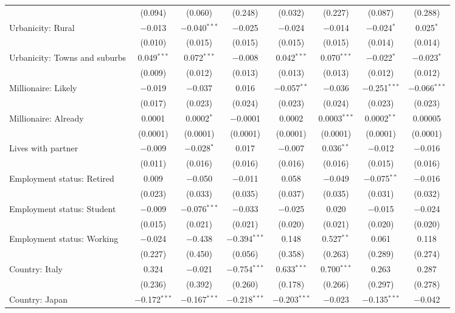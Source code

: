 \begin{tabular}{@{\extracolsep{5pt}}lccccccc}
  & (0.094) & (0.060) & (0.248) & (0.032) & (0.227) & (0.087) & (0.288) \\ 
  Urbanicity: Rural & $-$0.013 & $-$0.040$^{***}$ & $-$0.025 & $-$0.024 & $-$0.014 & $-$0.024$^{*}$ & 0.025$^{*}$ \\ 
  & (0.010) & (0.015) & (0.015) & (0.015) & (0.015) & (0.014) & (0.014) \\ 
  Urbanicity: Towns and suburbs & 0.049$^{***}$ & 0.072$^{***}$ & $-$0.008 & 0.042$^{***}$ & 0.070$^{***}$ & $-$0.022$^{*}$ & $-$0.023$^{*}$ \\ 
  & (0.009) & (0.012) & (0.013) & (0.013) & (0.013) & (0.012) & (0.012) \\ 
  Millionaire: Likely & $-$0.019 & $-$0.037 & 0.016 & $-$0.057$^{**}$ & $-$0.036 & $-$0.251$^{***}$ & $-$0.066$^{***}$ \\ 
  & (0.017) & (0.023) & (0.024) & (0.023) & (0.024) & (0.023) & (0.023) \\ 
  Millionaire: Already & 0.0001 & 0.0002$^{*}$ & $-$0.0001 & 0.0002 & 0.0003$^{***}$ & 0.0002$^{**}$ & 0.00005 \\ 
  & (0.0001) & (0.0001) & (0.0001) & (0.0001) & (0.0001) & (0.0001) & (0.0001) \\ 
  Lives with partner & $-$0.009 & $-$0.028$^{*}$ & 0.017 & $-$0.007 & 0.036$^{**}$ & $-$0.012 & $-$0.016 \\ 
  & (0.011) & (0.016) & (0.016) & (0.016) & (0.016) & (0.015) & (0.016) \\ 
  Employment status: Retired & 0.009 & $-$0.050 & $-$0.011 & 0.058 & $-$0.049 & $-$0.075$^{**}$ & $-$0.016 \\ 
  & (0.023) & (0.033) & (0.035) & (0.037) & (0.035) & (0.031) & (0.032) \\ 
  Employment status: Student & $-$0.009 & $-$0.076$^{***}$ & $-$0.033 & $-$0.025 & 0.020 & $-$0.015 & $-$0.024 \\ 
  & (0.015) & (0.021) & (0.021) & (0.020) & (0.021) & (0.020) & (0.020) \\ 
  Employment status: Working & $-$0.024 & $-$0.438 & $-$0.394$^{***}$ & 0.148 & 0.527$^{**}$ & 0.061 & 0.118 \\ 
  & (0.227) & (0.450) & (0.056) & (0.358) & (0.263) & (0.289) & (0.274) \\ 
  Country: Italy & 0.324 & $-$0.021 & $-$0.754$^{***}$ & 0.633$^{***}$ & 0.700$^{***}$ & 0.263 & 0.287 \\ 
  & (0.236) & (0.392) & (0.260) & (0.178) & (0.266) & (0.297) & (0.278) \\ 
  Country: Japan & $-$0.172$^{***}$ & $-$0.167$^{***}$ & $-$0.218$^{***}$ & $-$0.203$^{***}$ & $-$0.023 & $-$0.135$^{***}$ & $-$0.042 \\ 

\end{tabular}
